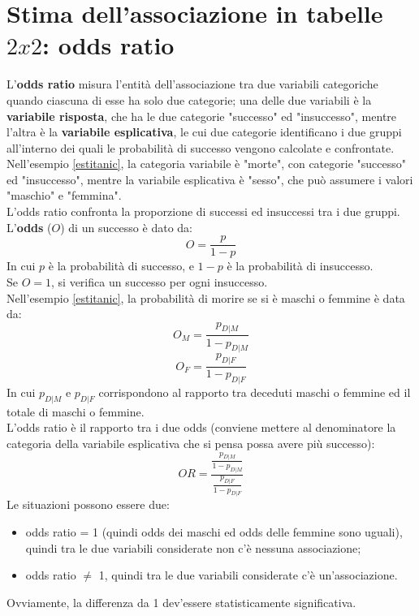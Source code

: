 \documentclass[10pt, draft]{book}
\newcommand{\tightlist}{%
\setlength{\itemsep}{1pt}\setlength{\parskip}{0pt}\setlength{\parsep}{0pt}}
\begin{document}
\section{Stima dell'associazione in tabelle \texorpdfstring{$2 x 2$}{Lg}: odds ratio}

L'\textbf{odds ratio} misura l'entità dell'associazione tra due variabili categoriche quando ciascuna di esse ha solo due categorie; una delle due variabili è la \textbf{variabile risposta}, che ha le due categorie "successo" ed "insuccesso", mentre l'altra è la \textbf{variabile esplicativa}, le cui due categorie identificano i due gruppi all'interno dei quali le probabilità di successo vengono calcolate e confrontate.
\\
Nell'esempio \ref{estitanic}, la categoria variabile è "morte", con categorie "successo" ed "insuccesso", mentre la variabile esplicativa è "sesso", che può assumere i valori "maschio" e "femmina".
\\
L'odds ratio confronta la proporzione di successi ed insuccessi tra i due gruppi.
\\
L'\textbf{odds} ($O$) di un successo è dato da:
\begin{equation}
O = \frac{p}{1-p}
\end{equation}
In cui $p$ è la probabilità di successo, e $1-p$ è la probabilità di insuccesso.
\\
Se $O = 1$, si verifica un successo per ogni insuccesso.
\\
Nell'esempio \ref{estitanic}, la probabilità di morire se si è maschi o femmine è data da:
\begin{equation}
O_M = \frac{p_{D|M}}{1-p_{D|M}}
\end{equation}
\begin{equation}
O_F = \frac{p_{D|F}}{1-p_{D|F}}
\end{equation}
In cui $p_{D|M}$ e $p_{D|F}$ corrispondono al rapporto tra deceduti maschi o femmine ed il totale di maschi o femmine.
\\
L'odds ratio è il rapporto tra i due odds (conviene mettere al denominatore la categoria della variabile esplicativa che si pensa possa avere più successo):
\begin{equation}
OR = \frac{\frac{p_{D|M}}{1-p_{D|M}}}{\frac{p_{D|F}}{1-p_{D|F}}}
\end{equation}
Le situazioni possono essere due:
\begin{itemize} \tightlist
    \item odds ratio = 1 (quindi odds dei maschi ed odds delle femmine sono uguali), quindi tra le due variabili considerate non c'è nessuna associazione;
    \item odds ratio $\neq$ 1, quindi tra le due variabili considerate c'è un'associazione.
\end{itemize}
Ovviamente, la differenza da 1 dev'essere statisticamente significativa.
\end{document}

